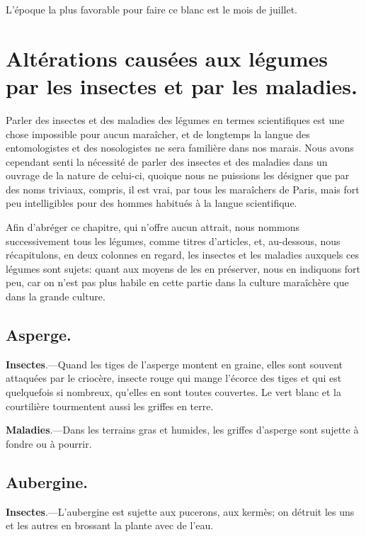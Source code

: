 \documentclass[10pt,a4paper]{book}
\begin{document}
L'époque la plus favorable pour faire ce blanc est le mois de juillet.

\chapter{Altérations causées aux légumes par les insectes et par les maladies.}

Parler des insectes et des maladies des légumes en termes scientifiques est une chose impossible pour aucun maraîcher, et de longtemps la langue des entomologistes et des nosologistes ne sera familière dans nos marais. Nous avons cependant senti la nécessité de parler des insectes et des maladies dans un ouvrage de la nature de celui-ci, quoique nous ne puissions les désigner que par des noms triviaux, compris, il est vrai, par tous les maraîchers de Paris, mais fort peu intelligibles pour des hommes habitués à la langue scientifique.

Afin d'abréger ce chapitre, qui n'offre aucun attrait, nous nommons successivement tous les légumes, comme titres d'articles, et, au-dessous, nous récapitulons, en deux colonnes en regard, les insectes et les maladies auxquels ces légumes sont sujets: quant aux moyens de les en préserver, nous en indiquons fort peu, car on n'est pas plus habile en cette partie dans la culture maraîchère que dans la grande culture.

\section{Asperge.}

\textbf{Insectes}.---Quand les tiges de l'asperge montent en graine, elles sont souvent attaquées par le criocère, insecte rouge qui mange l'écorce des tiges et qui est quelquefois si nombreux, qu'elles en sont toutes couvertes. Le vert blanc et la courtilière tourmentent aussi les griffes en terre.

\textbf{Maladies}.---Dans les terrains gras et humides, les griffes d'asperge sont sujette à fondre ou à pourrir.

\section{Aubergine.}

\textbf{Insectes}.---L'aubergine est sujette aux pucerons, aux kermès; on détruit les uns et les autres en brossant la plante avec de l'eau.
\end{document}
